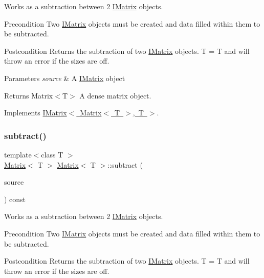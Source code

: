 Works as a subtraction between 2 \mbox{\hyperlink{class_i_matrix}{I\+Matrix}} objects. 

\begin{DoxyPrecond}{Precondition}
Two \mbox{\hyperlink{class_i_matrix}{I\+Matrix}} objects must be created and data filled within them to be subtracted. 
\end{DoxyPrecond}
\begin{DoxyPostcond}{Postcondition}
Returns the subtraction of two \mbox{\hyperlink{class_i_matrix}{I\+Matrix}} objects. T = T and will throw an error if the sizes are off.
\end{DoxyPostcond}

\begin{DoxyParams}{Parameters}
{\em source} & A \mbox{\hyperlink{class_i_matrix}{I\+Matrix}} object \\
\hline
\end{DoxyParams}
\begin{DoxyReturn}{Returns}
Matrix$<$\+T$>$ A dense matrix object. 
\end{DoxyReturn}


Implements \mbox{\hyperlink{class_i_matrix_a0bf5046efed75799656059ce2980a851}{I\+Matrix$<$ Matrix$<$ T $>$, T $>$}}.

\mbox{\label{class_matrix_ad319fb2dd61bb12ebcdb81c693d37d8c}} 
\subsubsection{\texorpdfstring{subtract()}{subtract()}\hspace{0.1cm}{\footnotesize\ttfamily [2/6]}}
{\footnotesize\ttfamily template$<$class T $>$ \\
\mbox{\hyperlink{class_matrix}{Matrix}}$<$ T $>$ \mbox{\hyperlink{class_matrix}{Matrix}}$<$ T $>$\+::subtract (\begin{DoxyParamCaption}\item[{const \mbox{\hyperlink{class_i_matrix}{I\+Matrix}}$<$ \mbox{\hyperlink{class_t_matrix}{T\+Matrix}}$<$ T $>$, T $>$ \&}]{source }\end{DoxyParamCaption}) const}



Works as a subtraction between 2 \mbox{\hyperlink{class_i_matrix}{I\+Matrix}} objects. 

\begin{DoxyPrecond}{Precondition}
Two \mbox{\hyperlink{class_i_matrix}{I\+Matrix}} objects must be created and data filled within them to be subtracted. 
\end{DoxyPrecond}
\begin{DoxyPostcond}{Postcondition}
Returns the subtraction of two \mbox{\hyperlink{class_i_matrix}{I\+Matrix}} objects. T = T and will throw an error if the sizes are off.
\end{DoxyPostcond}

